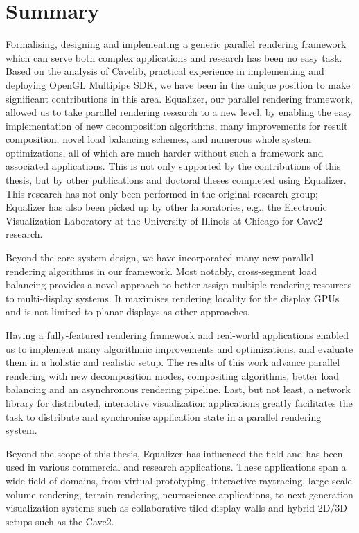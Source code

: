 \section{Summary}

Formalising, designing and implementing a generic parallel rendering framework
which can serve both complex applications and research has been no easy task.
Based on the analysis of Cavelib, practical experience in implementing and
deploying OpenGL Multipipe SDK, we have been in the unique position to make
significant contributions in this area. Equalizer, our parallel rendering
framework, allowed us to take parallel rendering research to a new level, by
enabling the easy implementation of new decomposition algorithms, many
improvements for result composition, novel load balancing schemes, and numerous
whole system optimizations, all of which are much harder without such a
framework and associated applications. This is not only supported by the
contributions of this thesis, but by other publications and doctoral theses
completed using Equalizer. This research has not only been performed in the
original research group; Equalizer has also been picked up by other
laboratories, e.g., the Electronic Visualization Laboratory at the University
of Illinois at Chicago for Cave2 research.

Beyond the core system design, we have incorporated many new parallel rendering
algorithms in our framework. Most notably, cross-segment load balancing
provides a novel approach to better assign multiple rendering resources to
multi-display systems. It maximises rendering locality for the display GPUs and
is not limited to planar displays as other approaches.

Having a fully-featured rendering framework and real-world applications enabled
us to implement many algorithmic improvements and optimizations, and evaluate
them in a holistic and realistic setup. The results of this work advance
parallel rendering with new decomposition modes, compositing algorithms, better
load balancing and an asynchronous rendering pipeline. Last, but not least, a
network library for distributed, interactive visualization applications greatly
facilitates the task to distribute and synchronise application state in a
parallel rendering system.

Beyond the scope of this thesis, Equalizer has influenced the field and has
been used in various commercial and research applications. These applications
span a wide field of domains, from virtual prototyping, interactive raytracing,
large-scale volume rendering, terrain rendering, neuroscience applications, to
next-generation visualization systems such as collaborative tiled display walls
and hybrid 2D/3D setups such as the Cave2.

